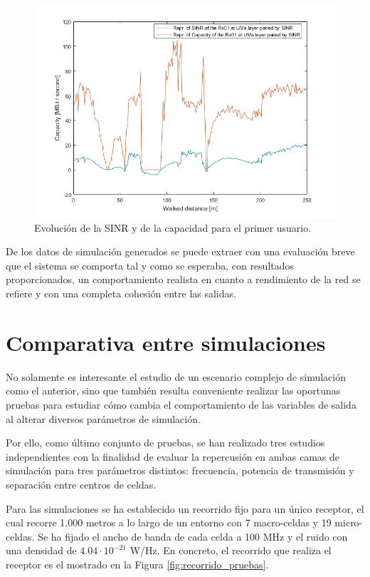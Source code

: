 \begin{figure}[h!]
	\centering
    \includegraphics[width=0.8\linewidth]{imagenes/6_2_capacidad_vs_sinr_uma.png}
	\caption{Evolución de la SINR y de la capacidad para el primer usuario.}
	\label{fig:simulacion_completa_sinr_uma_vs_capacidad}
\end{figure}

De los datos de simulación generados se puede extraer con una evaluación breve que el sistema se comporta tal y como se esperaba, con resultados proporcionados, un comportamiento realista en cuanto a rendimiento de la red se refiere y con una completa cohesión entre las salidas.

\section{Comparativa entre simulaciones}

No solamente es interesante el estudio de un escenario complejo de simulación como el anterior, sino que también resulta conveniente realizar las oportunas pruebas para estudiar cómo cambia el comportamiento de las variables de salida al alterar diversos parámetros de simulación.

Por ello, como último conjunto de pruebas, se han realizado tres estudios independientes con la finalidad de evaluar la repercusión en ambas camas de simulación para tres parámetros distintos: frecuencia, potencia de transmisión y separación entre centros de celdas.

Para las simulaciones se ha establecido un recorrido fijo para un único receptor, el cual recorre 1.000 metros a lo largo de un entorno con 7 macro-celdas y 19 micro-celdas. Se ha fijado el ancho de banda de cada celda a 100 MHz y el ruido con una densidad de $4.04·10^{-21}$ W/Hz. En concreto, el recorrido que realiza el receptor es el mostrado en la Figura \ref{fig:recorrido_pruebas}.

